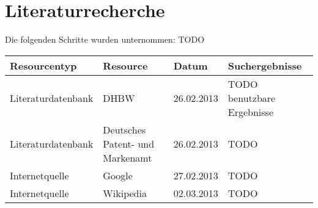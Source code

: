\section{Literaturrecherche}
Die folgenden Schritte wurden unternommen: TODO

\renewcommand{\arraystretch}{1.5}
\begin{table}[htp]
\centering
\begin{tabular}{l|p{3.5cm}|l|p{3.5cm}}
Resourcentyp & Resource & Datum & Suchergebnisse\\
\hline
Literaturdatenbank & DHBW & 26.02.2013 & TODO benutzbare Ergebnisse\\
Literaturdatenbank & Deutsches Patent- und Markenamt & 26.02.2013 & TODO\\
Internetquelle & Google & 27.02.2013 & TODO\\
Internetquelle & Wikipedia & 02.03.2013 & TODO\\
\end{tabular}
\end{table}
\renewcommand{\arraystretch}{1}
%

